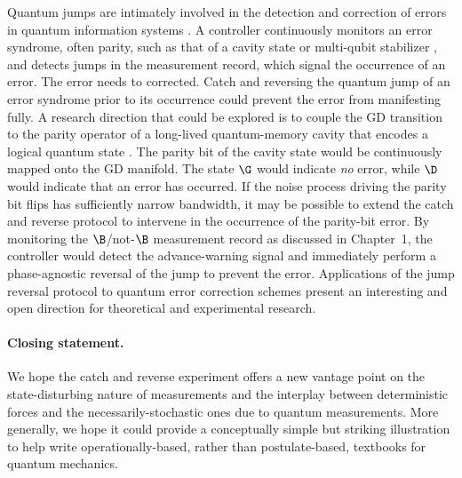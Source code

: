 Quantum jumps are intimately involved in the detection and correction
of errors in quantum information systems \citep{Sun2013,Ofek2016}.
A controller continuously monitors an error syndrome, often parity,
such as that of a cavity state \citep{Ofek2016,Cohen2017-cw-parity-msr}
or multi-qubit stabilizer \citep{Huembeli2017}, and detects jumps
in the measurement record, which signal the occurrence of an error.
The error needs to corrected. Catch and reversing the quantum jump
of an error syndrome prior to its occurrence could prevent the error
from manifesting fully. A research direction that could be explored
is to couple the GD transition to the parity operator of a long-lived
quantum-memory cavity \citep{Kirchmair2013} that encodes a logical
quantum state \citep{Cochrane1999-catCode,Mirrahimi2014,Leghtas2015,Michael2016,LiLinshu2017,Touzard2017}.
The parity bit of the cavity state would be continuously mapped onto
the GD manifold. The state $\G$ would indicate \emph{no} error, while
$\D$ would indicate that an error has occurred. If the noise process
driving the parity bit flips has sufficiently narrow bandwidth, it
may be possible to extend the catch and reverse protocol to intervene
in the occurrence of the parity-bit error. By monitoring the $\B$/not-$\B$
measurement record as discussed in Chapter~1, the controller would
detect the advance-warning signal and immediately perform a phase-agnostic
reversal of the jump to prevent the error. Applications of the jump
reversal protocol to quantum error correction schemes present an interesting
and open direction for theoretical and experimental research. 

\paragraph{Closing statement. }

We hope the catch and reverse experiment offers a new vantage point
on the state-disturbing nature of measurements and the interplay between
deterministic forces and the necessarily-stochastic ones due to quantum
measurements. More generally, we hope it could provide a conceptually
simple but striking illustration to help write operationally-based,
rather than postulate-based, textbooks for quantum mechanics.

